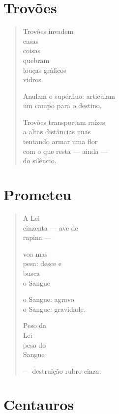 \chapter{Trovões}

\begin{verse}
Trovões invadem\\
casas\\
coisas\\
quebram\\
louças gráficos\\
\qquad\qquad\qquad vidros.

Anulam o supérfluo: articulam\\
um campo para o destino.

Trovões transportam raízes\\
a altas distâncias nuas\\
tentando armar uma flor\\
com o que resta --- ainda ---\\
do silêncio.
\end{verse}

\chapter{Prometeu}

\begin{verse}
A Lei\\
cinzenta --- ave de\\
\qquad\qquad\qquad\quad rapina ---

voa mas\\
pesa: desce e\\
\qquad\qquad\quad busca\\
\qquad\qquad\quad o Sangue

o Sangue: agravo\\
o Sangue: gravidade.

Peso da\\
Lei\\
peso do\\
Sangue

--- destruição rubro-cinza.
\end{verse}

\chapter{Centauros}

